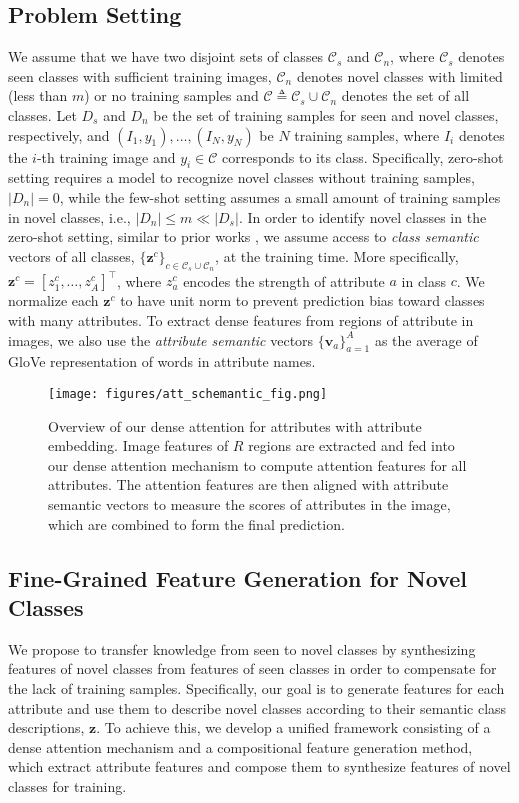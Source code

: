 \documentclass[10pt,journal,compsoc]{IEEEtran}
\newcommand{\z}{\boldsymbol{z}}
\renewcommand{\v}{\boldsymbol{v}}
\newcommand{\C}{\mathcal{C}}
\newcommand{\1}{\boldsymbol{1}}
\newcommand{\0}{\boldsymbol{0}}
\newcommand{\<}{\langle}
\renewcommand{\>}{\rangle}
\begin{document}
\subsection{Problem Setting}
We assume that we have two disjoint sets of classes $\C_s$ and $\C_n$, where $\C_s$ denotes seen classes with sufficient training images, $\C_n$ denotes novel classes with limited (less than $m$) or no training samples and $\C \triangleq \C_s \cup \C_n$ denotes the set of all classes. Let $D_s$ and $D_n$ be the set of training samples for seen and novel classes, respectively, and ${(I_1, y_1),\dots,(I_N, y_N)}$ be $N$ training samples, where $I_i$ denotes the $i$-th training image and $y_i \in \C$ corresponds to its class.
Specifically, zero-shot setting requires a model to  recognize novel classes without training samples, $|D_n| = 0$, while the few-shot setting assumes a small amount of training samples in novel classes, i.e., $|D_n| \leq m \ll |D_s|$.
In order to identify novel classes in the zero-shot setting, similar to prior works \cite{Xian:CVPR19,Schonfeld:CVPR19,Zhu:ICCV19}, we assume access to \emph{class semantic} vectors of all classes, $\{\z^c\}_{c\in \C_s \cup \C_n}$, at the training time. More specifically, $\z^c = [z^c_1, \ldots, z^c_A]^\top$, where $z^c_a$ encodes the strength of attribute $a$ in class $c$. We normalize each $\z^c$ to have unit norm to prevent prediction bias toward classes with many attributes. To extract dense features from regions of attribute in images, we also use the \textit{attribute semantic} vectors $\{\v_a\}^A_{a=1}$ as the average of GloVe representation \cite{Pennington:EMNLP14} of words in attribute names. 

\begin{figure*}[t]
\centering
\texttt{[image: figures/att\_schemantic\_fig.png]}
\vspace{-0mm}
\caption{
\small{
Overview of our dense attention for attributes with attribute embedding. Image features of $R$ regions are extracted and fed into our dense attention mechanism to compute attention features for all attributes. The attention features are then aligned with attribute semantic vectors to measure the scores of attributes in the image, which are combined to form the final prediction.}
}

\label{fig:att_schemantic_fig}
\end{figure*}


\subsection{Fine-Grained Feature Generation for Novel Classes}
We propose to transfer knowledge from seen to novel classes by synthesizing features of novel classes from features of seen classes in order to compensate for the lack of training samples.
Specifically, our goal is to generate features for each attribute and use them to describe novel classes according to their semantic class descriptions, $\z$.
To achieve this, we develop a unified framework consisting of a dense attention mechanism and a compositional feature generation method, which extract attribute features and compose them to synthesize features of novel classes for training.
\end{document}
